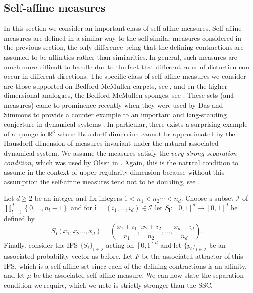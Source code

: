 \documentclass[12pt]{amsart}
\numberwithin{equation}{section}
\renewcommand{\geq}{\geqslant}
\begin{document}
\subsection{Self-affine measures}\label{self-affineresults}


In this section we consider an important class of self-affine measures.  Self-affine measures are defined in a similar way to the self-similar measures considered in the previous section, the only difference being that the defining contractions are assumed to be affinities rather than similarities.  In general, such measures are much more difficult to handle due to the fact that different rates of distortion can occur in different directions.  The specific class of self-affine measures we consider are those supported on Bedford-McMullen carpets, see \cite{bedford, mcmullen}, and on the higher dimensional analogues, the Bedford-McMullen sponges, see \cite{kenyonperes, sponges}.  These sets (and measures) came to prominence recently when they were used by Das and Simmons to provide a counter example to an important and long-standing conjecture in dynamical systems \cite{das-simmons}. In particular, there exists a surprising example of a sponge in $\mathbb{R}^3$ whose Hausdorff dimension cannot be approximated by the Hausdorff dimension of measures invariant under the natural associated dynamical system.  We assume the measures satisfy the \emph{very strong separation condition}, which was used by Olsen in \cite{sponges}.  Again, this is the natural condition to assume in the context of upper regularity dimension because without this assumption the self-affine measures tend not to be doubling, see \cite{doublingcarpets, fraser-howroyd}.


Let $d \geq 2$ be an integer and fix integers $1<n_1 < n_2 \cdots < n_d$.  Choose a subset $\mathcal{I}$ of $\prod_{l=1}^{d} \left\lbrace 0,\ldots, n_l-1 \right\rbrace$ and for $\textbf{i}=(i_1, \ldots, i_d)\in \mathcal{I} $  let $S_{\textbf{i}} \colon [0,1]^d \rightarrow [0,1]^d$ be defined by
\[
S_{\textbf{i}}(x_1,x_2\ldots, x_d)= \left( \frac{x_1+i_1}{n_1}, \frac{x_2+i_2}{n_2}, \ldots, \frac{x_d+i_d}{n_d} \right) .
\]
 Finally, consider the IFS $\{S_i\}_{i \in \mathcal{I}}$  acting on $[0,1]^d$ and let $\{p_i\}_{i \in \mathcal{I}}$ be an associated probability vector as before.  Let $F$ be the associated attractor of this IFS, which is a self-affine set since each of the defining contractions is an affinity, and let $\mu$ be the associated self-affine measure.  We can now state the separation condition we require, which we note  is  strictly stronger than the SSC.
\end{document}
